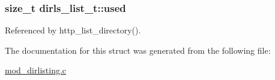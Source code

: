 \hypertarget{structdirls__list__t_a58fd06c266713663b03114f7502877f2}{
\subsubsection[{used}]{\setlength{\rightskip}{0pt plus 5cm}size\-\_\-t dirls\-\_\-list\-\_\-t\-::used}}\label{structdirls__list__t_a58fd06c266713663b03114f7502877f2}


Referenced by http\-\_\-list\-\_\-directory().



The documentation for this struct was generated from the following file\-:\begin{DoxyCompactItemize}
\item 
\hyperlink{mod__dirlisting_8c}{mod\-\_\-dirlisting.\-c}\end{DoxyCompactItemize}
